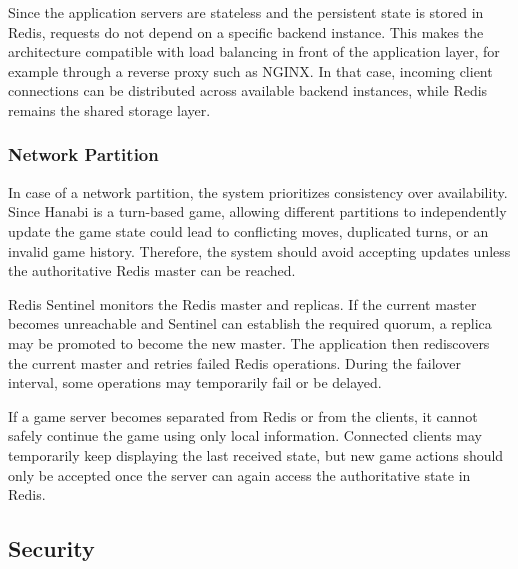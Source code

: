 \documentclass{scrartcl}
\begin{document}
    Since the application servers are stateless and the persistent state is stored in Redis, requests do not depend on a specific backend instance. 
    This makes the architecture compatible with load balancing in front of the application layer, for example through a reverse proxy such as NGINX. 
    In that case, incoming client connections can be distributed across available backend instances, while Redis remains the shared storage layer.
  \subsubsection{Network Partition}
    In case of a network partition, the system prioritizes consistency over availability. 
    Since Hanabi is a turn-based game, allowing different partitions to independently update the game state could lead to conflicting moves, duplicated turns, or an invalid game history. 
    Therefore, the system should avoid accepting updates unless the authoritative Redis master can be reached.

    Redis Sentinel monitors the Redis master and replicas. 
    If the current master becomes unreachable and Sentinel can establish the required quorum, a replica may be promoted to become the new master. 
    The application then rediscovers the current master and retries failed Redis operations. 
    During the failover interval, some operations may temporarily fail or be delayed.

    If a game server becomes separated from Redis or from the clients, it cannot safely continue the game using only local information. 
    Connected clients may temporarily keep displaying the last received state, but new game actions should only be accepted once the server can again access the authoritative state in Redis.
\subsection{Security}\label{security}
\end{document}
